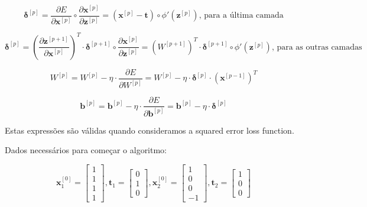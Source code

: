 \documentclass[a4paper,12pt]{article} %
\begin{document}
\begin{enumerate}
\begin{equation}
    \bm{\delta}^{[p]} = \frac{\partial E}{\partial \textbf{x}^{[p]}} \circ \frac{\partial \textbf{x}^{[p]}}{\partial \textbf{z}^{[p]}} = (\textbf{x}^{[p]} - \mathbf{t}) \circ \phi'(\mathbf{z}^{[p]}) \text{, para a última camada}
\end{equation}    

\begin{equation}
    \bm{\delta}^{[p]} = (\frac{\partial \textbf{z}^{[p+1]}}{\partial \textbf{x}^{[p]}})^T \cdot \bm{\delta}^{[p+1]} \circ \frac{\partial \textbf{x}^{[p]}}{\partial \textbf{z}^{[p]}} = ({W}^{[p+1]})^T \cdot \bm{\delta}^{[p+1]} \circ \phi'(\textbf{z}^{[p]}) \text{, para as outras camadas}
\end{equation}

\begin{equation}
    {W}^{[p]} = {W}^{[p]} - \eta \cdot \frac{\partial E}{\partial {W}^{[p]}} = {W}^{[p]} - \eta \cdot \bm{\delta}^{[p]} \cdot (\textbf{x}^{[p-1]})^T
\end{equation}

\begin{equation}
    \textbf{b}^{[p]} = \textbf{b}^{[p]} - \eta \cdot \frac{\partial E}{\partial \textbf{b}^{[p]}} = \textbf{b}^{[p]} - \eta \cdot \bm{\delta}^{[p]}
\end{equation}

Estas expressões são válidas quando consideramos a squared error loss function.

Dados necessários para começar o algoritmo:

\begin{equation*}
    \textbf{x}^{[0]}_1 = \begin{bmatrix} 1 \\ 1 \\ 1 \\ 1 \end{bmatrix} , \textbf{t}_1 = \begin{bmatrix} 0 \\ 1 \\ 0 \end{bmatrix} , \textbf{x}^{[0]}_2 = \begin{bmatrix} 1 \\ 0 \\ 0 \\ -1 \end{bmatrix} , \textbf{t}_2 = \begin{bmatrix} 1 \\ 0 \\ 0 \end{bmatrix}
\end{equation*}


\end{enumerate}
\end{document}
